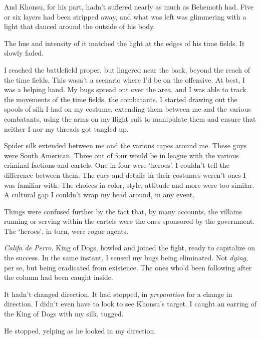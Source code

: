 And Khonsu, for his part, hadn't suffered nearly as much as Behemoth had.  Five or six layers had been stripped away, and what was left was glimmering with a light that danced around the outside of his body.



The hue and intensity of it matched the light at the edges of his time fields.  It slowly faded.



I reached the battlefield proper, but lingered near the back, beyond the reach of the time fields.  This wasn't a scenario where I'd be on the offensive.  At best, I was a helping hand.  My bugs spread out over the area, and I was able to track the movements of the time fields, the combatants.  I started drawing out the spools of silk I had on my costume, extending them between me and the various combatants, using the arms on my flight suit to manipulate them and ensure that neither I nor my threads got tangled up.



Spider silk extended between me and the various capes around me.  These guys were South American.  Three out of four would be in league with the various criminal factions and cartels.  One in four were `heroes'.  I couldn't tell the difference between them.  The cues and details in their costumes weren't ones I was familiar with.  The choices in color, style, attitude and more were too similar.  A cultural gap I couldn't wrap my head around, in any event.



Things were confused further by the fact that, by many accounts, the villains running or serving within the cartels were the ones sponsored by the government.  The `heroes', in turn, were rogue agents.



\emph{Califa de Perro,} King of Dogs,\emph{ }howled and joined the fight, ready to capitalize on the success.  In the same instant, I sensed my bugs being eliminated.  Not \emph{dying}, per se, but being eradicated from existence.  The ones who'd been following after the column had been caught inside.



It hadn't changed direction.  It had stopped, in \emph{preparation} for a change in direction.  I didn't even have to look to see Khonsu's target.  I caught an earring of the King of Dogs with my silk, tugged.



He stopped, yelping as he looked in my direction.



